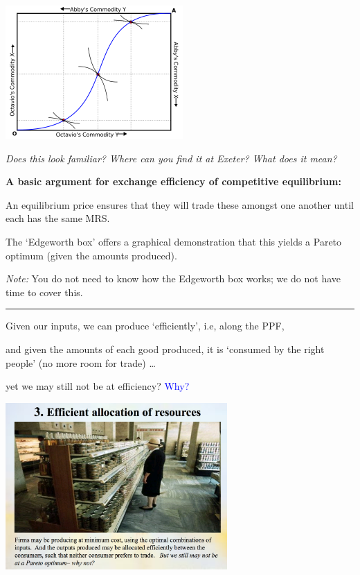\documentclass[]{article}
\begin{document}
\includegraphics[height=2in]{picsfigs/Contract-curve-on-edgeworth-box.png}

\bigskip

\emph{Does this look familiar? Where can you find it at Exeter? What
does it mean?}

\bigskip

\textbf{A basic argument for exchange efficiency of competitive
equilibrium:}

An equilibrium price ensures that they will trade these amongst one
another until each has the same MRS.

The `Edgeworth box' offers a graphical demonstration that this yields a
Pareto optimum (given the amounts produced).

\emph{Note:} You do not need to know how the Edgeworth box works; we do
not have time to cover this.

\begin{center}\rule{0.5\linewidth}{\linethickness}\end{center}

Given our inputs, we can produce `efficiently', i.e, along the PPF,

and given the amounts of each good produced, it is `consumed by the
right people' (no more room for trade) \ldots{}

yet we may still not be at efficiency? \textcolor{blue}{Why?}

\includegraphics[height=2.5in]{picsfigs/toplevelefficiency.png}
\end{document}
